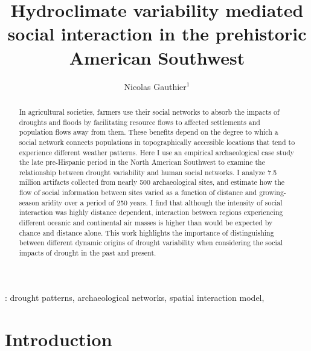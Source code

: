 \documentclass[10pt]{iopart}
\begin{document}
\title{Hydroclimate variability mediated social interaction in the prehistoric American Southwest}

\author{Nicolas Gauthier$^1$}

\address{$^1$ School of Human Evolution and Social Change, 900 S Cady Mall, Tempe, USA}


\begin{abstract}
  In agricultural societies, farmers use their social networks to absorb the impacts of droughts and floods by facilitating resource flows to affected settlements and population flows away from them. These benefits depend on the degree to which a social network connects populations in topographically accessible locations that tend to experience different weather patterns. Here I use an empirical archaeological case study the late pre-Hispanic period in the North American Southwest to examine the relationship between drought variability and human social networks. I analyze 7.5 million artifacts collected from nearly 500 archaeological sites, and estimate how the flow of social information between sites varied as a function of distance and growing-season aridity over a period of 250 years. I find that although the intensity of social interaction was highly distance dependent, interaction between regions experiencing different oceanic and continental air masses is higher than would be expected by chance and distance alone. This work highlights the importance of distinguishing between different dynamic origins of drought variability when considering the social impacts of drought in the past and present.
\end{abstract}

: drought patterns, archaeological networks, spatial interaction model, 

\maketitle


\section*{Introduction}
\end{document}
